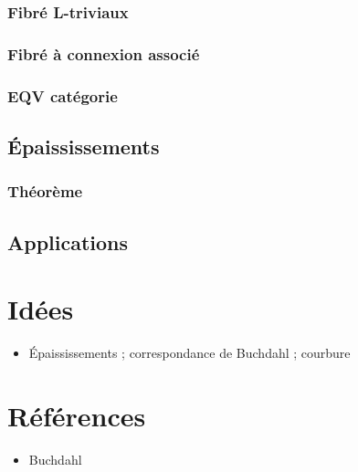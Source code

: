 \documentclass[12pt,makeidx]{amsart}
\begin{document}
\subsubsection{Fibré L-triviaux}
\label{sec:orgheadline7}

\subsubsection{Fibré à connexion associé}
\label{sec:orgheadline8}

\subsubsection{EQV catégorie}
\label{sec:orgheadline9}

\subsection{Épaississements}
\label{sec:orgheadline12}

\subsubsection{Théorème}
\label{sec:orgheadline11}


\subsection{Applications}
\label{sec:orgheadline13}

\section{Idées}
\label{sec:orgheadline15}
\begin{itemize}
\item Épaississements ; correspondance de Buchdahl ; courbure
\end{itemize}
\section{Références}
\label{sec:orgheadline16}
\begin{itemize}
\item Buchdahl
\end{itemize}
\end{document}
